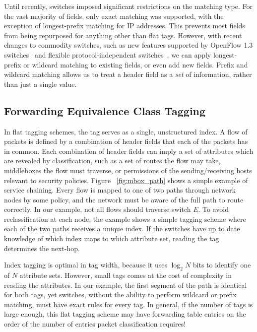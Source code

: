 Until recently, switches imposed significant restrictions on the matching type.  For the vast majority of fields, only exact matching was supported, with the exception of longest-prefix matching for IP addresses. This prevents most fields from being repurposed for anything other than flat tags. However, with recent changes to commodity switches, such as new features supported by OpenFlow 1.3 switches~\cite{of13} and flexible protocol-independent switches~\cite{P4}, we can apply longest-prefix or wildcard matching to existing fields, or even add new fields. Prefix and wildcard matching allows us to treat a header field as a \emph{set} of information, rather than just a single value. 

\subsection{Forwarding Equivalence Class Tagging}
In flat tagging schemes, the tag serves as a single, unstructured index.  A flow of packets is defined by a combination of header fields that each of the packets has in common. Each combination of header fields can imply a set of attributes which are revealed by classification, such as a set of routes the flow may take, middleboxes the flow must traverse, or permissions of the sending/receiving hosts relevant to security policies.  Figure ~\ref{fig:mbox_path} shows a simple example of service chaining. Every flow is mapped to one of two paths through network nodes by some policy, and the network must be aware of the full path to route correctly. In our example, not all flows should traverse switch $E$. To avoid reclassification at each node, the example shows a simple tagging scheme where each of the two paths receives a unique index. If the switches have up to date knowledge of which index maps to which attribute set, reading the tag determines the next-hop. 

Index tagging is optimal in tag width, because it uses $\log_2{N}$ bits to identify one of $N$ attribute sets. However, small tags comes at the cost of complexity in reading the attributes. In our example, the first segment of the path is identical for both tags, yet switches, without the ability to perform wildcard or prefix matching, must have exact rules for every tag. In general, if the number of tags is large enough, this flat tagging scheme may have forwarding table entries on the order of the number of entries packet classification requires!



